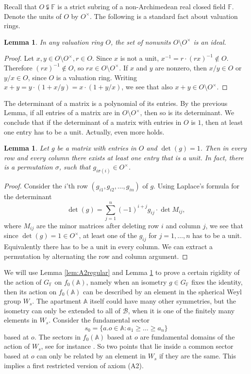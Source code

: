 \documentclass[12pt]{amsart}
\newcommand{\F}{\mathbb{F} }
\newcommand{\A}{\mathbb{A}}
\newcommand{\B}{\mathcal{B}}
\numberwithin{equation}{section}
\newtheorem{lemma}[theorem]{Lemma}
\theoremstyle{remark} %
\begin{document}
Recall that $O\subsetneqq \F$ is a strict subring of a non-Archimedean real closed field $\F$. Denote the units of $O$ by $O^\times$. The following is a standard fact about valuation rings.
\begin{lemma}
	In any valuation ring $O$, the set of nonunits $O\setminus O^\times$ is an ideal.
\end{lemma}
\begin{proof}
	Let $x,y\in O\setminus O^\times, r \in O $. Since $x$ is not a unit, $x^{-1}=r\cdot (rx)^{-1} \not\in O$. Therefore $(rx)^{-1}\not\in O$, so $rx \in O \setminus O^\times$. If $x$ and $y$ are nonzero, then $x/y\in O$ or $y/x\in O$, since $O$ is a valuation ring. Writing $x+y=y\cdot(1+x/y)=x\cdot(1+y/x)$, we see that also $x+y\in O\setminus O^\times$.
\end{proof}
The determinant of a matrix is a polynomial of its entries. By the previous Lemma, if all entries of a matrix are in $O\setminus O^\times$, then so is its determinant. We conclude that if the determinant of a matrix with entries in $O$ is $1$, then at least one entry has to be a unit. Actually, even more holds.
\begin{lemma}
	\label{lem:A2unit}
	Let $g$ be a matrix with entries in $O$ and $\operatorname{det}(g)=1$. Then in every row and every column there exists at least one entry that is a unit. In fact, there is a permutation $\sigma$, such that $g_{i\sigma(i)}\in O^\times$.
\end{lemma}
\begin{proof}
	Consider the $i$'th row $(g_{i1}, g_{i2}, \ldots, g_{in})$ of $g$. Using Laplace's formula for the determinant
	$$
	\det (g) = \sum_{j=1}^n (-1)^{i+j} g_{ij} \cdot \det M_{ij},
	$$
	where $M_{ij}$ are the minor matrices after deleting row $i$ and column $j$, we see that since $\det (g)=1 \in O^\times$, at least one of the $g_{ij}$ for $j=1, \ldots , n$ has to be a unit. Equivalently there has to be a unit in every column. We can extract a permutation by alternating the row and column argument. 
\end{proof}

We will use Lemma \ref{lem:A2regular} and Lemma \ref{lem:A2unit} to prove a certain rigidity of the action of $G_\F$ on $f_0(\A)$, namely when an isometry $g\in G_\F$ fixes the identity, then its action on $f_0(\A)$ can be described by an element in the spherical Weyl group $W_s$. The apartment $\A$ itself could have many other symmetries, but the isometry can only be extended to all of $\B$, when it is one of the finitely many elements in $W_s$. Consider the fundamental sector
$$
s_0 = \{ a.o \in \A \colon a_1 \geq \ldots \geq a_n \}
$$
based at $o$. The sectors in $f_0(\A)$ based at $o$ are fundamental domains of the action of $W_s$, see for instance \cite[Chapter 10.3]{Hum2}. So two points that lie inside a common sector based at $o$ can only be related by an element in $W_s$ if they are the same. This implies a first restricted version of axiom (A2). 
\end{document}
